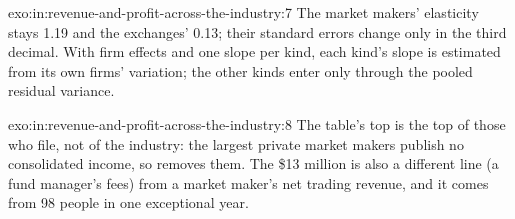 \begin{solution}{exo:in:revenue-and-profit-across-the-industry:7}
The market makers' elasticity stays 1.19 and the exchanges' 0.13; their standard errors change only in the third
decimal. With firm effects and one slope per kind, each kind's slope is estimated from
its own firms' variation; the other kinds enter only through the pooled residual variance.
\end{solution}

\begin{solution}{exo:in:revenue-and-profit-across-the-industry:8}
The table's top is the top of those who file, not of the industry: the largest private market makers publish no
consolidated income, so  removes them. The \$13 million is also a different line (a fund manager's fees)
from a market maker's net trading revenue, and it comes from 98 people in one exceptional year.
\end{solution}

